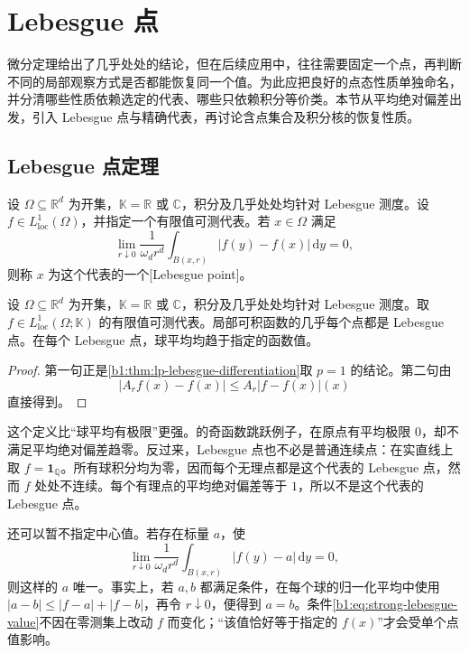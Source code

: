 \section{Lebesgue 点}
\label{b1:sec:1404}

微分定理给出了几乎处处的结论，但在后续应用中，往往需要固定一个点，再判断不同的局部观察方式是否都能恢复同一个值。为此应把良好的点态性质单独命名，并分清哪些性质依赖选定的代表、哪些只依赖积分等价类。本节从平均绝对偏差出发，引入 Lebesgue 点与精确代表，再讨论含点集合及积分核的恢复性质。

\subsection{Lebesgue 点定理}
\label{b1:subsec:140401}

\begin{definition}\label{b1:def:lebesgue-point}
设 \(\Omega\subseteq\mathbb R^d\) 为开集，\(\mathbb K=\mathbb R\) 或 \(\mathbb C\)，积分及几乎处处均针对 Lebesgue 测度。设 \(f\in L^1_{\mathrm{loc}}(\Omega)\)，并指定一个有限值可测代表。若 \(x\in\Omega\) 满足
\[
 \lim_{r\downarrow0}\frac1{\omega_dr^d}
        \int_{B(x,r)}|f(y)-f(x)|\,\mathrm dy=0,
\]
则称 \(x\) 为这个代表的一个[Lebesgue point]。
\end{definition}

\begin{theorem}[Lebesgue 点]\label{b1:thm:lebesgue-point}
设 \(\Omega\subseteq\mathbb R^d\) 为开集，\(\mathbb K=\mathbb R\) 或 \(\mathbb C\)，积分及几乎处处均针对 Lebesgue 测度。取 \(f\in L^1_{\mathrm{loc}}(\Omega;\mathbb K)\) 的有限值可测代表。局部可积函数的几乎每个点都是 Lebesgue 点。在每个 Lebesgue 点，球平均均趋于指定的函数值。
\end{theorem}
\begin{proof}
第一句正是\cref{b1:thm:lp-lebesgue-differentiation}取 \(p=1\) 的结论。第二句由
\[
 |A_rf(x)-f(x)|\leq A_r|f-f(x)|(x)
\]
直接得到。
\end{proof}

这个定义比“球平均有极限”更强。的奇函数跳跃例子，在原点有平均极限 \(0\)，却不满足平均绝对偏差趋零。反过来，Lebesgue 点也不必是普通连续点：在实直线上取 \(f=\mathbf1_{\mathbb Q}\)。所有球积分均为零，因而每个无理点都是这个代表的 Lebesgue 点，然而 \(f\) 处处不连续。每个有理点的平均绝对偏差等于 \(1\)，所以不是这个代表的 Lebesgue 点。

\ProseParagraphBreak

还可以暂不指定中心值。若存在标量 \(a\)，使
\begin{equation}\label{b1:eq:strong-lebesgue-value}
 \lim_{r\downarrow0}\frac1{\omega_dr^d}\int_{B(x,r)}|f(y)-a|\,\mathrm dy=0,
\end{equation}
则这样的 \(a\) 唯一。事实上，若 \(a,b\) 都满足条件，在每个球的归一化平均中使用 \(|a-b|\leq|f-a|+|f-b|\)，再令 \(r\downarrow0\)，便得到 \(a=b\)。条件\eqref{b1:eq:strong-lebesgue-value}不因在零测集上改动 \(f\) 而变化；“该值恰好等于指定的 \(f(x)\)”才会受单个点值影响。

